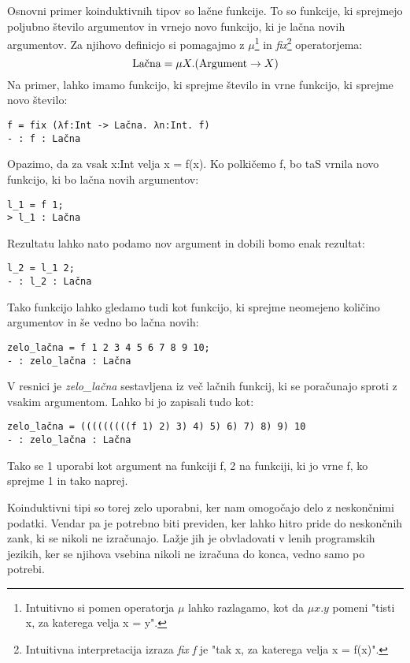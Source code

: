 \documentclass[12pt,a4paper,openany]{book}
\begin{document}
Osnovni primer koinduktivnih tipov so lačne funkcije. To so funkcije, ki sprejmejo poljubno število argumentov in vrnejo novo funkcijo, ki je lačna novih argumentov. Za njihovo definicjo 
si pomagajmo z \(\mu\)\footnote{Intuitivno si pomen operatorja \(\mu\) lahko razlagamo, kot da \(\mu x.y\) pomeni "tisti x, za katerega velja x = y".} in \emph{fix}\footnote{Intuitivna 
interpretacija izraza \emph{fix f} je "tak x, za katerega velja x = f(x)".} operatorjema:
\begin{equation}
    \text{Lačna} = \mu X. (\text{Argument} \rightarrow X) \notag
\end{equation}
Na primer, lahko imamo funkcijo, ki sprejme število in vrne funkcijo, ki sprejme novo število:
\begin{lstlisting}
f = fix (λf:Int -> Lačna. λn:Int. f)
- : f : Lačna
\end{lstlisting}
Opazimo, da za vsak x:Int velja x = f(x).
Ko polkičemo f, bo taS vrnila novo funkcijo, ki bo lačna novih argumentov:
\begin{lstlisting}
l_1 = f 1;
> l_1 : Lačna
\end{lstlisting}
Rezultatu lahko nato podamo nov argument in dobili bomo enak rezultat:
\begin{lstlisting}
l_2 = l_1 2;
- : l_2 : Lačna  
\end{lstlisting}
Tako funkcijo lahko gledamo tudi kot funkcijo, ki sprejme neomejeno količino argumentov in še vedno bo lačna novih:
\begin{lstlisting}
zelo_lačna = f 1 2 3 4 5 6 7 8 9 10;
- : zelo_lačna : Lačna
\end{lstlisting}
V resnici je \emph{zelo\_lačna} sestavljena iz več lačnih funkcij, ki se poračunajo sproti z vsakim argumentom. Lahko bi jo zapisali tudo kot:
\begin{lstlisting}
zelo_lačna = (((((((((f 1) 2) 3) 4) 5) 6) 7) 8) 9) 10
- : zelo_lačna : Lačna
\end{lstlisting}
Tako se 1 uporabi kot argument na funkciji f, 2 na funkciji, ki jo vrne f, ko sprejme 1 in tako naprej.

Koinduktivni tipi so torej zelo uporabni, ker nam omogočajo delo z neskončnimi podatki. Vendar pa je potrebno biti previden, ker lahko hitro pride do neskončnih zank, ki se nikoli ne izračunajo. 
Lažje jih je obvladovati v lenih programskih jezikih, ker se njihova vsebina nikoli ne izračuna do konca, vedno samo po potrebi.
\end{document}
